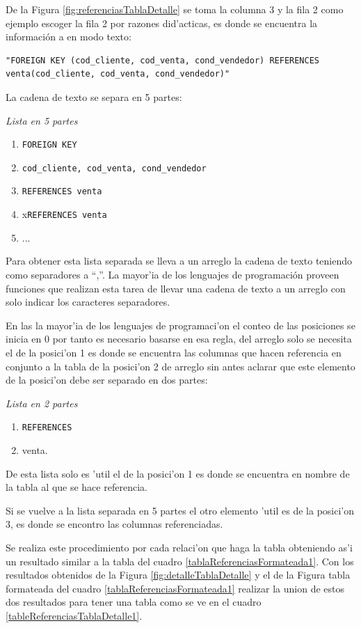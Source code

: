 De la Figura \ref{fig:referenciasTablaDetalle} se toma la columna 3 y la fila 2 como ejemplo escoger la fila 2 por razones did'acticas, es donde se encuentra la informaci\'on a en modo texto:
\lstset{language=sql,breaklines=true}
\begin{lstlisting}
"FOREIGN KEY (cod_cliente, cod_venta, cond_vendedor) REFERENCES venta(cod_cliente, cod_venta, cond_vendedor)"
\end{lstlisting}
 La cadena de texto se separa en 5 partes:
 
 \textit{Lista en 5 partes}
 \begin{enumerate}
 \item \texttt{FOREIGN KEY}
 \item \texttt{cod\_cliente, cod\_venta, cond\_vendedor}
 \item \texttt{REFERENCES venta}
 \item x\texttt{REFERENCES venta}
 \item ...
 \end{enumerate}
 
 Para obtener esta lista separada se lleva a un arreglo la cadena de texto teniendo como separadores a ``,''. La mayor'ia de los lenguajes de programaci\'on proveen funciones que realizan esta tarea de llevar una cadena de texto a un arreglo con solo indicar los caracteres separadores.
 
 En las la mayor'ia de los lenguajes de programaci'on el conteo de las posiciones se inicia en 0 por tanto es necesario basarse en esa regla, del arreglo solo se necesita el de la posici'on 1 es donde se encuentra las columnas que hacen referencia en conjunto a la tabla de la posici'on 2 de arreglo sin antes aclarar que este elemento de la posici'on debe ser separado en dos partes:
 
\textit{Lista en 2 partes} 
 \begin{enumerate}
 \item \texttt{REFERENCES}
 \item venta.
\end{enumerate}  

De esta lista solo es 'util el de la posici'on 1 es donde se encuentra en nombre de la tabla al que se hace referencia.

Si se vuelve a la lista separada en 5 partes el otro elemento 'util es de la posici'on 3, es donde se encontro las columnas referenciadas.

Se realiza este procedimiento por cada relaci'on que haga la tabla obteniendo as'i un resultado similar a la tabla del cuadro \ref{tablaReferenciasFormateada1}.
Con los resultados obtenidos de la Figura \ref{fig:detalleTablaDetalle} y el de la Figura tabla formateada del cuadro \ref{tablaReferenciasFormateada1} realizar la union de estos dos resultados para tener una tabla como se ve en el cuadro \ref{tableReferenciasTablaDetalle1}.


